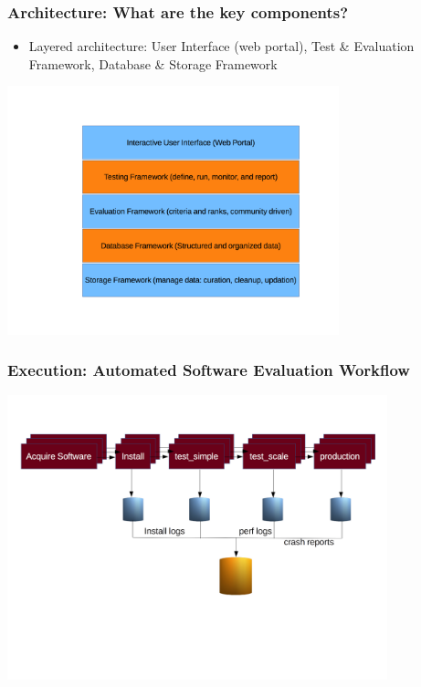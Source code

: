 \documentclass[hyperref={pdfpagelabels=false},12pt]{beamer}
\begin{document}
\begin{frame}
\frametitle{Architecture: What are the key components?}
\begin{itemize}
\item 
Layered architecture: User Interface (web portal), Test \& Evaluation Framework, Database \& Storage Framework
\end{itemize}
\includegraphics[width=9.6cm]{Architecture}
\end{frame}

\begin{frame}
\frametitle{Execution: Automated Software Evaluation Workflow}
\begin{center}
\includegraphics[width=11cm]{workflow}
\end{center}
\end{frame}
\end{document}

